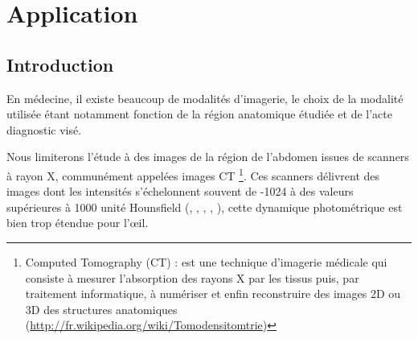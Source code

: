 

\chapter{Application}


	\section{Introduction}
		En médecine, il existe beaucoup de modalités d'imagerie, le choix de la modalité utilisée étant notamment fonction de la région anatomique étudiée et de l'acte diagnostic visé.

	Nous limiterons l'étude à des images de la région de l'abdomen issues de scanners à rayon X, communément appelées images CT \footnote{Computed Tomography (CT) : est une technique d'imagerie médicale qui consiste à mesurer l'absorption des rayons X par les tissus puis, par traitement informatique, à numériser et enfin reconstruire des images 2D ou 3D des structures anatomiques (\url{http://fr.wikipedia.org/wiki/Tomodensitomtrie})}. Ces scanners délivrent des images dont les intensités s'échelonnent souvent de -1024 à des valeurs supérieures à 1000 unité Hounsfield (\citep[Rossner]{rossner1990}, \citep[zhu]{zhu1986}, \citep[Brown]{Brown1998}, \citep[Coudray]{Coudray2010}, \citep[Bengoetxea]{Bengoetxea2005}), cette dynamique photométrique est bien trop étendue pour l'\oe{}il.
	
